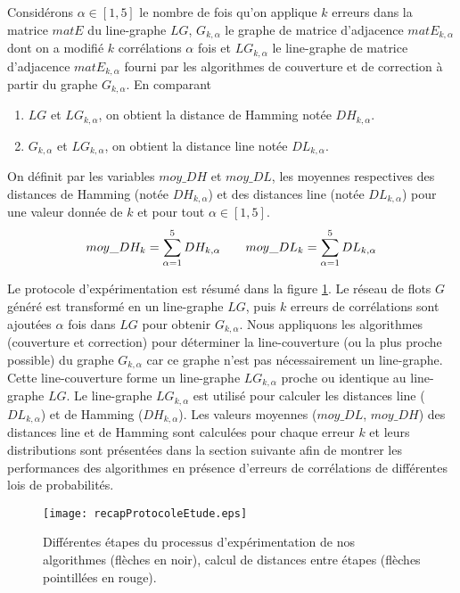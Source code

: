 Consid\'erons 
  $\alpha \in [1, 5]$ le nombre de fois qu'on applique $k$ erreurs dans la matrice $matE$ du line-graphe $LG$,  
 $G_{k, \alpha}$ le graphe de matrice d'adjacence $matE_{k, \alpha}$ dont on a modifi\'e $k$ corr\'elations $\alpha$ fois et 
 $LG_{k, \alpha}$  le line-graphe de matrice d'adjacence $matE_{k, \alpha}$ fourni par les algorithmes de couverture et de correction \`a partir du graphe $G_{k, \alpha}$.
\newline
En comparant
\begin{enumerate}
\item  $LG$ et $LG_{k, \alpha}$, on obtient la distance de Hamming not\'ee $DH_{k,\alpha}$.
\item $G_{k,\alpha}$ et $LG_{k,\alpha}$, on obtient la distance line not\'ee $DL_{k,\alpha}$.
\end{enumerate}
On d\'efinit par les variables $moy\_DH$ et $moy\_DL$, les moyennes respectives des distances de Hamming (not\'ee $DH_{k,\alpha}$) et des distances line (not\'ee $DL_{k,\alpha}$) pour une valeur donn\'ee de $k$ et pour tout $\alpha \in [1, 5]$.
\begin{equation}
moy\_DH_k = \sum_{\alpha = 1}^{5} DH_{k, \alpha} \hspace{2 em}
moy\_DL_k = \sum_{\alpha = 1}^{5} DL_{k, \alpha}
\end{equation}

Le protocole d'exp\'erimentation est r\'esum\'e dans la figure \ref{recap_protocole_etude}. Le r\'eseau de flots $G$ g\'en\'er\'e est transform\'e en un line-graphe $LG$, puis $k$ erreurs de corr\'elations  sont ajout\'ees $\alpha$ fois dans $LG$ pour obtenir $G_{k,\alpha}$. Nous appliquons les algorithmes (couverture et correction) pour d\'eterminer la line-couverture (ou la plus proche possible) du graphe $G_{k,\alpha}$ car ce graphe n'est pas n\'ecessairement un line-graphe. Cette line-couverture forme un line-graphe $LG_{k, \alpha}$ proche ou identique au line-graphe $LG$. Le line-graphe $LG_{k, \alpha}$ est utilis\'e pour calculer les distances line ($DL_{k, \alpha}$) et de Hamming ($DH_{k, \alpha}$).
Les valeurs moyennes ($moy\_DL$, $moy\_DH$) des distances line et de Hamming sont calcul\'ees pour chaque erreur $k$ et leurs distributions sont pr\'esent\'ees dans la section suivante afin de montrer les performances des algorithmes en pr\'esence d'erreurs de corr\'elations de diff\'erentes lois de probabilit\'es.
\begin{figure}[htb!] 
\centering
\texttt{[image: recapProtocoleEtude.eps]}
\caption{ Diff\'erentes \'etapes du processus d'exp\'erimentation de nos algorithmes (fl\`eches en noir), calcul de distances entre \'etapes (fl\`eches pointill\'ees en rouge).}
\label{recap_protocole_etude} 
\end{figure}
